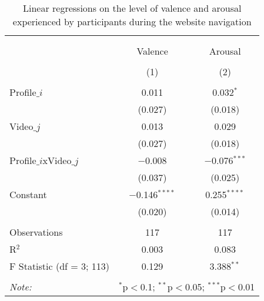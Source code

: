 
\begin{table}[H] \centering 
  \caption{ Linear regressions on the level of valence and arousal experienced by participants during the website navigation} 
  \label{tbl:arousal} 
\begin{tabular}{@{\extracolsep{5pt}}lcc} 
\\[-1.8ex]\hline 
\hline \\[-1.8ex] 
\\[-1.8ex] & Valence & Arousal \\ 
\\[-1.8ex] & (1) & (2)\\ 
\hline \\[-1.8ex] 
 Profile$\_i$ & 0.011 & 0.032$^{*}$ \\ 
  & (0.027) & (0.018) \\ 
  Video$\_j$ & 0.013 & 0.029 \\ 
  & (0.027) & (0.018) \\ 
  Profile$\_i$xVideo$\_j$ & $-$0.008 & $-$0.076$^{***}$ \\ 
  & (0.037) & (0.025) \\ 
  Constant & $-$0.146$^{****}$ & 0.255$^{****}$ \\ 
  & (0.020) & (0.014) \\ 
 \hline \\[-1.8ex] 
Observations & 117 & 117 \\ 
R$^{2}$ & 0.003 & 0.083 \\ 
F Statistic (df = 3; 113) & 0.129 & 3.388$^{**}$ \\ 
\hline 
\hline \\[-1.8ex] 
\textit{Note:}  & \multicolumn{2}{l}{$^{*}$p$<$0.1; $^{**}$p$<$0.05; $^{***}$p$<$0.01} \\ 
\end{tabular} 
\end{table} 
